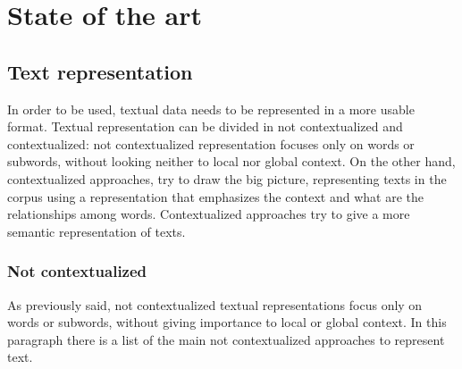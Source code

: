 \documentclass[\main/main.tex]{subfiles}
\begin{document}
\chapter{State of the art}

\section{Text representation}
In order to be used, textual data needs to be represented in a more usable format. Textual representation can be divided in not contextualized and contextualized: not contextualized representation focuses only on words or subwords, without looking neither to local nor global context. On the other hand, contextualized approaches, try to draw the big picture, representing texts in the corpus using a representation that emphasizes the context and what are the relationships among words. Contextualized approaches try to give a more semantic representation of texts.
\subsection{Not contextualized}
As previously said, not contextualized textual representations focus only on words or subwords, without giving importance to local or global context. In this paragraph there is a list of the main not contextualized approaches to represent text. 
\end{document}
